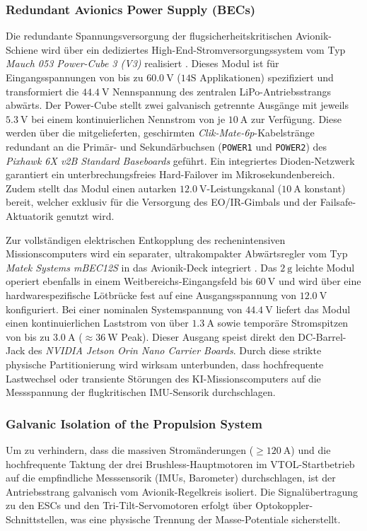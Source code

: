 \subsubsection{Redundant Avionics Power Supply (BECs)}
Die redundante Spannungsversorgung der flugsicherheitskritischen Avionik-Schiene wird über ein dediziertes High-End-Stromversorgungssystem vom Typ \textit{Mauch 053 Power-Cube 3 (V3)} realisiert \cite{premium_mauch_053}. Dieses Modul ist für Eingangsspannungen von bis zu $\SI{60.0}{\V}$ ($14\text{S Applikationen}$) spezifiziert und transformiert die $\SI{44.4}{\V}$ Nennspannung des zentralen LiPo-Antriebsstrangs abwärts. Der Power-Cube stellt zwei galvanisch getrennte Ausgänge mit jeweils $\SI{5.3}{\V}$ bei einem kontinuierlichen Nennstrom von je $\SI{10}{\A}$ zur Verfügung. Diese werden über die mitgelieferten, geschirmten \textit{Clik-Mate-6p}-Kabelstränge redundant an die Primär- und Sekundärbuchsen (\texttt{POWER1} und \texttt{POWER2}) des \textit{Pixhawk 6X v2B Standard Baseboards} geführt. Ein integriertes Dioden-Netzwerk garantiert ein unterbrechungsfreies Hard-Failover im Mikrosekundenbereich. Zudem stellt das Modul einen autarken $\SI{12.0}{\V}$-Leistungskanal ($\SI{10}{\A}$ konstant) bereit, welcher exklusiv für die Versorgung des EO/IR-Gimbals und der Failsafe-Aktuatorik genutzt wird.

Zur vollständigen elektrischen Entkopplung des rechenintensiven Missionscomputers wird ein separater, ultrakompakter Abwärtsregler vom Typ \textit{Matek Systems mBEC12S} in das Avionik-Deck integriert \cite{premium_matek_mbec12s}. Das $\SI{2}{\g}$ leichte Modul operiert ebenfalls in einem Weitbereichs-Eingangsfeld bis $\SI{60}{\V}$ und wird über eine hardwarespezifische Lötbrücke fest auf eine Ausgangsspannung von $\SI{12.0}{\V}$ konfiguriert. Bei einer nominalen Systemspannung von $\SI{44.4}{\V}$ liefert das Modul einen kontinuierlichen Laststrom von über $\SI{1.3}{\A}$ sowie temporäre Stromspitzen von bis zu $\SI{3.0}{\A}$ ($\approx \SI{36}{\W}$ Peak). Dieser Ausgang speist direkt den DC-Barrel-Jack des \textit{NVIDIA Jetson Orin Nano Carrier Boards}. Durch diese strikte physische Partitionierung wird wirksam unterbunden, dass hochfrequente Lastwechsel oder transiente Störungen des KI-Missionscomputers auf die Messspannung der flugkritischen IMU-Sensorik durchschlagen.

\subsubsection{Galvanic Isolation of the Propulsion System}
Um zu verhindern, dass die massiven Stromänderungen ($\ge \SI{120}{\A}$) und die hochfrequente Taktung der drei Brushless-Hauptmotoren im VTOL-Startbetrieb auf die empfindliche Messsensorik (IMUs, Barometer) durchschlagen, ist der Antriebsstrang galvanisch vom Avionik-Regelkreis isoliert. Die Signalübertragung zu den ESCs und den Tri-Tilt-Servomotoren erfolgt über Optokoppler-Schnittstellen, was eine physische Trennung der Masse-Potentiale sicherstellt.

